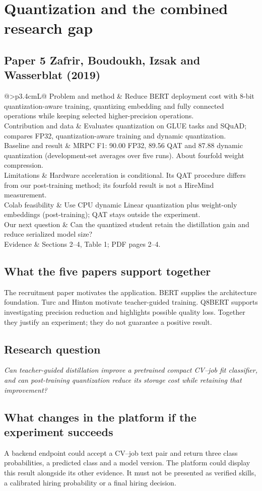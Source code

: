 \documentclass[10pt,a4paper]{article}
\makeatletter
\newcommand{\paper}[9]{%
\subsection*{#1}
\begin{tabularx}{\linewidth}{@{}>{\bfseries}p{3.4cm}L@{}}\toprule
Problem and method & #2\\
Contribution and data & #3\\
Baseline and result & #4\\
Limitations & #5\\
Colab feasibility & #6\\
Our next question & #7\\
Evidence & #8\\\bottomrule
\end{tabularx}}
\makeatother
\begin{document}
\section{Quantization and the combined research gap}
\paper{Paper 5 \quad Zafrir, Boudoukh, Izsak and Wasserblat (2019)}
{Reduce BERT deployment cost with 8-bit quantization-aware training, quantizing embedding and fully connected operations while keeping selected higher-precision operations.}
{Evaluates quantization on GLUE tasks and SQuAD; compares FP32, quantization-aware training and dynamic quantization.}
{MRPC F1: 90.00 FP32, 89.56 QAT and 87.88 dynamic quantization (development-set averages over five runs). About fourfold weight compression.}
{Hardware acceleration is conditional. Its QAT procedure differs from our post-training method; its fourfold result is not a HireMind measurement.}
{Use CPU dynamic Linear quantization plus weight-only embeddings (post-training); QAT stays outside the experiment.}
{Can the quantized student retain the distillation gain and reduce serialized model size?}
{Sections 2--4, Table 1; PDF pages 2--4.}{}

\subsection{What the five papers support together}
The recruitment paper motivates the application. BERT supplies the architecture foundation. Turc and Hinton motivate teacher-guided training. Q8BERT supports investigating precision reduction and highlights possible quality loss. Together they justify an experiment; they do not guarantee a positive result.

\subsection{Research question}
\emph{Can teacher-guided distillation improve a pretrained compact CV--job fit classifier, and can post-training quantization reduce its storage cost while retaining that improvement?}

\subsection{What changes in the platform if the experiment succeeds}
A backend endpoint could accept a CV--job text pair and return three class probabilities, a predicted class and a model version. The platform could display this result alongside its other evidence. It must not be presented as verified skills, a calibrated hiring probability or a final hiring decision.
\end{document}
